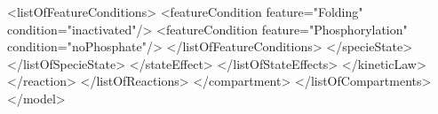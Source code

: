 \documentclass{cekarticle}
\newenvironment{changemargin}[2]{\begin{list}{}{%
\setlength{\leftmargin}{0pt}%
\setlength{\rightmargin}{0pt}%
\setlength{\listparindent}{\parindent}%
\setlength{\itemindent}{\parindent}%
\addtolength{\leftmargin}{#1}%
\addtolength{\rightmargin}{#2}%
}\item }{\end{list}}
\begin{document}
\begin{changemargin}{-2cm}{0cm}
\begin{example}
                                        <listOfFeatureConditions>
                                            <featureCondition feature="Folding" condition="inactivated"/>
                                            <featureCondition feature="Phosphorylation" condition="noPhosphate"/>
                                        </listOfFeatureConditions>
                                    </specieState>
                                </listOfSpecieState>
                            </stateEffect>  
                        </listOfStateEffects>                         
                    </kineticLaw>
                </reaction>
            </listOfReactions>
        </compartment>
    </listOfCompartments>
</model>
\end{example}
\end{changemargin}




\end{document}
